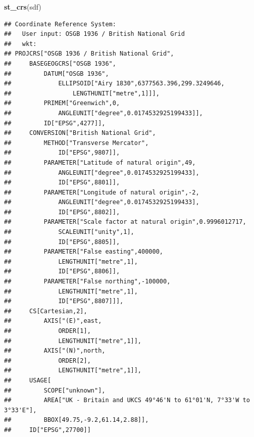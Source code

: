 \documentclass[
]{book}
\newenvironment{Shaded}{\begin{snugshade}}{\end{snugshade}}
\newcommand{\KeywordTok}[1]{\textcolor[rgb]{0.13,0.29,0.53}{\textbf{#1}}}
\newcommand{\NormalTok}[1]{#1}
\begin{document}
\begin{Shaded}
\begin{Highlighting}[]
\KeywordTok{st_crs}\NormalTok{(sdf)}
\end{Highlighting}
\end{Shaded}

\begin{verbatim}
## Coordinate Reference System:
##   User input: OSGB 1936 / British National Grid 
##   wkt:
## PROJCRS["OSGB 1936 / British National Grid",
##     BASEGEOGCRS["OSGB 1936",
##         DATUM["OSGB 1936",
##             ELLIPSOID["Airy 1830",6377563.396,299.3249646,
##                 LENGTHUNIT["metre",1]]],
##         PRIMEM["Greenwich",0,
##             ANGLEUNIT["degree",0.0174532925199433]],
##         ID["EPSG",4277]],
##     CONVERSION["British National Grid",
##         METHOD["Transverse Mercator",
##             ID["EPSG",9807]],
##         PARAMETER["Latitude of natural origin",49,
##             ANGLEUNIT["degree",0.0174532925199433],
##             ID["EPSG",8801]],
##         PARAMETER["Longitude of natural origin",-2,
##             ANGLEUNIT["degree",0.0174532925199433],
##             ID["EPSG",8802]],
##         PARAMETER["Scale factor at natural origin",0.9996012717,
##             SCALEUNIT["unity",1],
##             ID["EPSG",8805]],
##         PARAMETER["False easting",400000,
##             LENGTHUNIT["metre",1],
##             ID["EPSG",8806]],
##         PARAMETER["False northing",-100000,
##             LENGTHUNIT["metre",1],
##             ID["EPSG",8807]]],
##     CS[Cartesian,2],
##         AXIS["(E)",east,
##             ORDER[1],
##             LENGTHUNIT["metre",1]],
##         AXIS["(N)",north,
##             ORDER[2],
##             LENGTHUNIT["metre",1]],
##     USAGE[
##         SCOPE["unknown"],
##         AREA["UK - Britain and UKCS 49°46'N to 61°01'N, 7°33'W to 3°33'E"],
##         BBOX[49.75,-9.2,61.14,2.88]],
##     ID["EPSG",27700]]
\end{verbatim}

  
\end{document}
